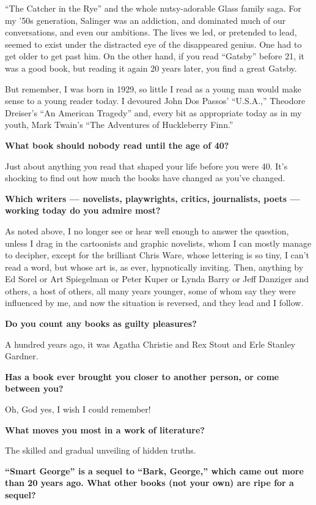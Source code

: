 ``The Catcher in the Rye'' and the whole nutsy-adorable Glass family
saga. For my '50s generation, Salinger was an addiction, and dominated
much of our conversations, and even our ambitions. The lives we led, or
pretended to lead, seemed to exist under the distracted eye of the
disappeared genius. One had to get older to get past him. On the other
hand, if you read ``Gatsby'' before 21, it was a good book, but reading
it again 20 years later, you find a great Gatsby.

But remember, I was born in 1929, so little I read as a young man would
make sense to a young reader today. I devoured John Dos Passos'
``U.S.A.,'' Theodore Dreiser's ``An American Tragedy'' and, every bit as
appropriate today as in my youth, Mark Twain's ``The Adventures of
Huckleberry Finn.''

\textbf{What book should nobody read until the age of 40?}

Just about anything you read that shaped your life before you were 40.
It's shocking to find out how much the books have changed as you've
changed.

\textbf{Which writers --- novelists, playwrights, critics, journalists,
poets --- working today do you admire most?}

As noted above, I no longer see or hear well enough to answer the
question, unless I drag in the cartoonists and graphic novelists, whom I
can mostly manage to decipher, except for the brilliant Chris Ware,
whose lettering is so tiny, I can't read a word, but whose art is, as
ever, hypnotically inviting. Then, anything by Ed Sorel or Art
Spiegelman or Peter Kuper or Lynda Barry or Jeff Danziger and others, a
host of others, all many years younger, some of whom say they were
influenced by me, and now the situation is reversed, and they lead and I
follow.

\textbf{Do you count any books as guilty pleasures?}

A hundred years ago, it was Agatha Christie and Rex Stout and Erle
Stanley Gardner.

\textbf{Has a book ever brought you closer to another person, or come
between you?}

Oh, God yes, I wish I could remember!

\textbf{What moves you most in a work of literature?}

The skilled and gradual unveiling of hidden truths.

\textbf{``Smart George'' is a sequel to ``Bark, George,'' which came out
more than 20 years ago. What other books (not your own) are ripe for a
sequel?}

